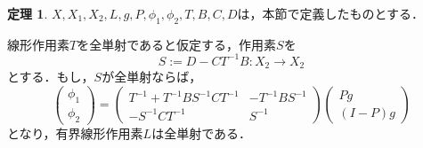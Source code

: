 \documentclass[11pt,a4paper,titlepage]{jsreport}
\theoremstyle{definition}
\newtheorem{thm}{定理}
\begin{document}
\begin{thm}
  \label{thm:6.2.1-L全単射}
  $X,X_1,X_2,L,g,P,\phi_1,\phi_2,T,B,C,D$は，本節で定義したものとする．

  線形作用素$T$を全単射であると仮定する，作用素$S$を
  \begin{equation*}
    S:=D-CT^{-1}B : X_2 \rightarrow X_2
  \end{equation*}
  とする．もし，$S$が全単射ならば，
  \begin{equation*}
    \begin{pmatrix}
      \phi_1 \\
      \phi_2
    \end{pmatrix}
    =
    \begin{pmatrix}
      T^{-1}+T^{-1}BS^{-1}CT^{-1} & -T^{-1}BS^{-1} \\
      -S^{-1}CT^{-1} & S^{-1}
    \end{pmatrix}
    \begin{pmatrix}
      Pg \\
      (I-P)g
    \end{pmatrix}
  \end{equation*}
  となり，有界線形作用素$L$は全単射である．
\end{thm}
\end{document}
